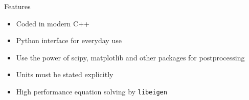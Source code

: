 %
%
%
%
%

\begin{frame}{Features}
  \begin{itemize}
  \item Coded in modern C++
  \item Python interface for everyday use
  \item Use the power of scipy, matplotlib and other packages for
    postprocessing
  \item Units must be stated explicitly
  \item High performance equation solving by \texttt{libeigen}
  \end{itemize}
\end{frame}

